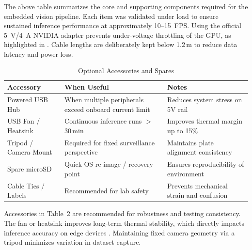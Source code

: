 The above table summarizes the core and supporting components required for the embedded vision pipeline.  
Each item was validated under load to ensure sustained inference performance at approximately 10–15~FPS.  
Using the official \SI{5}{V}/\SI{4}{A} NVIDIA adapter prevents under-voltage throttling of the GPU, as highlighted in \cite{edge-power-stability}.  
Cable lengths are deliberately kept below 1.2\,m to reduce data latency and power loss.

\vspace{1em}

\begin{table}[H]
	\centering
	\caption{Optional Accessories and Spares}
	\begin{tabular}{|L{4.0cm}|L{7.2cm}|L{3.0cm}|}
		\hline
		\textbf{Accessory} & \textbf{When Useful} & \textbf{Notes} \\ \hline
		Powered USB Hub & When multiple peripherals exceed onboard current limit & Reduces system stress on 5V rail \\ \hline
		USB Fan / Heatsink & Continuous inference runs $>$30\,min & Improves thermal margin up to 15\% \cite{thermal-design} \\ \hline
		Tripod / Camera Mount & Required for fixed surveillance perspective & Maintains plate alignment consistency \\ \hline
		Spare microSD & Quick OS re-image / recovery point & Ensures reproducibility of environment \\ \hline
		Cable Ties / Labels & Recommended for lab safety & Prevents mechanical strain and confusion \\ \hline
	\end{tabular}
\end{table}

Accessories in Table~2 are recommended for robustness and testing consistency.  
The fan or heatsink improves long-term thermal stability, which directly impacts inference accuracy on edge devices \cite{thermal-design}.  
Maintaining fixed camera geometry via a tripod minimizes variation in dataset capture.

